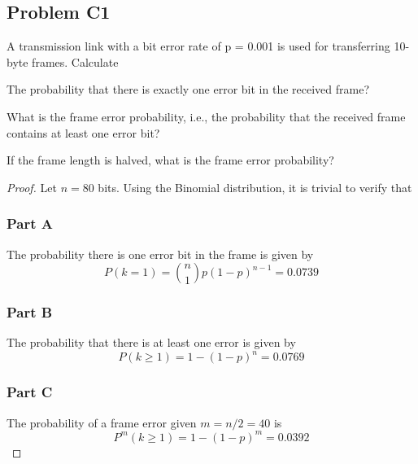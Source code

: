 \documentclass[../../../main.tex]{subfiles}
\begin{document}
\subsection{Problem C1}
\begin{wts}
  A transmission link with a bit error rate of p = 0.001 is used for transferring 10-byte frames. Calculate
\begin{enumalpha}
    \item The probability that there is exactly one error bit in the received frame?
    \item What is the frame error probability, i.e., the probability that the received frame contains at least one error bit?
    \item 
    If the frame length is halved, what is the frame error probability?
\end{enumalpha}
\end{wts}
\begin{proof}
Let $n = 80$ bits. Using the Binomial distribution, it is trivial to verify that
\subsubsection*{Part A}
The probability there is one error bit in the frame is given by 
\[
P(k=1) = \binom{n}{1}p(1-p)^{n-1} = 0.0739
\]
\subsubsection*{Part B}
The probability that there is at least one error is given by
\[
P(k\geq 1) = 1 - (1-p)^n = 0.0769
\]

\subsubsection*{Part C}
The probability of a frame error given $m=n/2 = 40$ is
\[
P^m(k\geq 1) = 1-(1-p)^m = 0.0392
\]

\end{proof}
\end{document}
